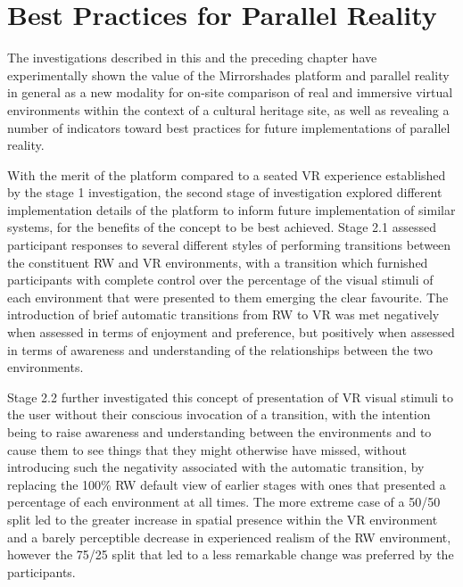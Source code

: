 
\section{Best Practices for Parallel Reality}

The investigations described in this and the preceding chapter have experimentally shown the value of the Mirrorshades platform and parallel reality in general as a new modality for on-site comparison of real and immersive virtual environments within the context of a cultural heritage site, as well as revealing a number of indicators toward best practices for future implementations of parallel reality.

With the merit of the platform compared to a seated VR experience established by the stage 1 investigation, the second stage of investigation explored different implementation details of the platform to inform future implementation of similar systems, for the benefits of the concept to be best achieved. Stage 2.1 assessed participant responses to several different styles of performing transitions between the constituent RW and VR environments, with a transition which furnished participants with complete control over the percentage of the visual stimuli of each environment that were presented to them emerging the clear favourite. The introduction of brief automatic transitions from RW to VR was met negatively when assessed in terms of enjoyment and preference, but positively when assessed in terms of awareness and understanding of the relationships between the two environments.

Stage 2.2 further investigated this concept of presentation of VR visual stimuli to the user without their conscious invocation of a transition, with the intention being to raise awareness and understanding between the environments and to cause them to see things that they might otherwise have missed, without introducing such the negativity associated with the automatic transition, by replacing the 100\% RW default view of earlier stages with ones that presented a percentage of each environment at all times. The more extreme case of a 50/50 split led to the greater increase in spatial presence within the VR environment and a barely perceptible decrease in experienced realism of the RW environment, however the 75/25 split that led to a less remarkable change was preferred by the participants.

